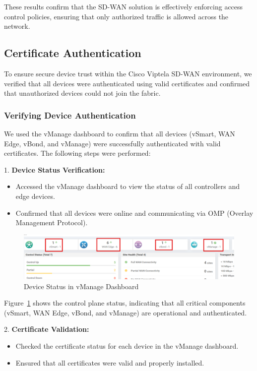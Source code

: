 \documentclass[12pt,english]{report}
\begin{document}
These results confirm that the SD-WAN solution is effectively enforcing access control policies, ensuring that only authorized traffic is allowed across the network.

\subsection{Certificate Authentication}
To ensure secure device trust within the Cisco Viptela SD-WAN environment, we verified that all devices were authenticated using valid certificates and confirmed that unauthorized devices could not join the fabric.

\subsubsection{Verifying Device Authentication} 

We used the vManage dashboard to confirm that all devices (vSmart, WAN Edge, vBond, and vManage) were successfully authenticated with valid certificates. The following steps were performed:

1. \textbf{Device Status Verification:}
   \begin{itemize}
       \item Accessed the vManage dashboard to view the status of all controllers and edge devices.
       \item Confirmed that all devices were online and communicating via OMP (Overlay Management Protocol).
   \end{itemize}

   \begin{figure}[H]
       \centering
       \includegraphics[width=1\textwidth]{chapter 4/gui-cert.png}
       \caption{Device Status in vManage Dashboard}
       \label{fig:device_status}
   \end{figure}

   Figure~\ref{fig:device_status} shows the control plane status, indicating that all critical components (vSmart, WAN Edge, vBond, and vManage) are operational and authenticated.

2. \textbf{Certificate Validation:}
   \begin{itemize}
       \item Checked the certificate status for each device in the vManage dashboard.
       \item Ensured that all certificates were valid and properly installed.
   \end{itemize}
\end{document}
